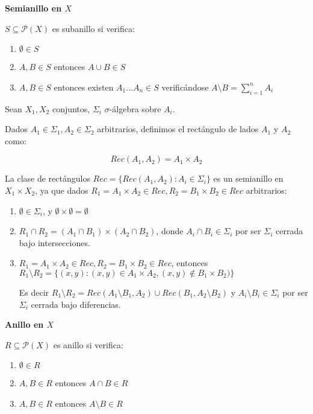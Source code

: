 \begin{definition} \textbf{Semianillo en $X$}

 $S\subseteq \mathcal{P}(X)$ es subanillo si verifica:
 
 \begin{enumerate}[i]
  \item $\emptyset \in S$
  \item $A,B \in S$ entonces $A\cup B \in S$
  \item $A,B \in S$ entonces existen $A_1 \ldots A_n \in S$ verificándose $A\setminus B = \sum_{i=1}^n A_i$
 \end{enumerate}
\end{definition}

\begin{example}
 \begin{definition}
  Sean $X_1, X_2$ conjuntos, $\Sigma_i$ $\sigma$-álgebra sobre $A_i$. 
  
  Dados $A_1 \in \Sigma_1, A_2 \in \Sigma_2$ arbitrarios, definimos el rectángulo de lados $A_1$ y $A_2$ como:
  
  \[Rec(A_1, A_2) = A_1 \times A_2\]
 \end{definition}
 
 
 La clase de rectángulos $Rec = \{Rec(A_1, A_2): A_i \in \Sigma_i\}$ es un semianillo en $X_1 \times X_2$,
 ya que dados $R_1 = A_1 \times A_2 \in Rec, R_2 = B_1 \times B_2 \in Rec$ arbitrarios:
 
 \begin{enumerate}
  \item $\emptyset \in \Sigma_i$, y $\emptyset \times \emptyset = \emptyset$
  \item $R_1 \cap R_2 = (A_1 \cap B_1) \times (A_2 \cap B_2)$, donde $A_i \cap B_i \in \Sigma_i$ por ser 
  $\Sigma_i$ cerrada bajo intersecciones.
  \item $R_1 = A_1 \times A_2 \in Rec, R_2 = B_1 \times B_2 \in Rec$, entonces 
  $R_1 \setminus R_2 = \{(x,y): (x,y) \in A_1 \times A_2, (x,y) \notin B_1 \times B_2)\}$
  
  Es decir $R_1 \setminus R_2 = Rec(A_1\setminus B_1, A_2) \cup Rec(B_1, A_2\setminus B_2)$ y 
  $A_i \setminus B_i \in \Sigma_i$ por ser $\Sigma_i$ cerrada bajo diferencias.
 \end{enumerate}

\end{example}


\begin{definition} \textbf{Anillo en $X$}

 $R\subseteq \mathcal{P}(X)$ es anillo si verifica:
 
 \begin{enumerate}[i]
  \item $\emptyset \in R$
  \item $A,B \in R$ entonces $A\cap B \in R$
  \item $A,B \in R$ entonces $A\setminus B \in R$
 \end{enumerate}
\end{definition}


